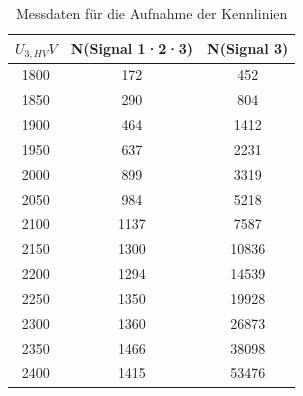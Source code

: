             \begin{table}[ht]
                \centering
                \begin{tabular}{c|c|c}
                    $U_{3,HV} \unit{V}$ & N(Signal 1·2·3) & N(Signal 3)  \\ 
                    \hline  1800 &  172 &   452\\
                    1850 &  290 &   804\\
                    1900 &  464 &  1412\\
                    1950 &  637 &  2231\\
                    2000 &  899 &  3319\\
                    2050 &  984 &  5218\\
                    2100 & 1137 &  7587\\
                    2150 & 1300 & 10836\\
                    2200 & 1294 & 14539\\
                    2250 & 1350 & 19928\\
                    2300 & 1360 & 26873\\
                    2350 & 1466 & 38098\\
                    2400 & 1415 & 53476\\
                \end{tabular} 
                \caption{Messdaten für die Aufnahme der Kennlinien}
                \label{ente}
            \end{table}
